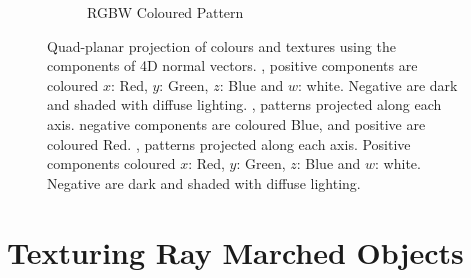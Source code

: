 \documentclass{l4proj}
\begin{document}
\begin{figure}[H]
\begin{subfigure}[b]{0.32\textwidth}
    \caption{
      RGBW Coloured Pattern
    }
    \label{fig:tex3}
  \end{subfigure}
  \caption{
    Quad-planar projection of colours and textures using the components of 4D normal vectors.
    , positive components are coloured $x$: Red, $y$: Green, $z$: Blue and $w$: white. Negative are dark and shaded with diffuse lighting.
    , patterns projected along each axis. negative components are coloured Blue, and positive are coloured Red.
    , patterns projected along each axis. Positive components coloured $x$: Red, $y$: Green, $z$: Blue and $w$: white. Negative are dark and shaded with diffuse lighting.
  }
  \label{fig:textures}
\end{figure}

\section{Texturing Ray Marched Objects}
\end{document}
